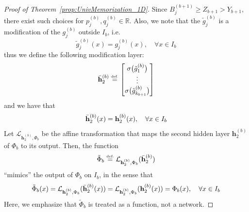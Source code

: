 \documentclass{article}
\numberwithin{equation}{section}
\theoremstyle{definition}
\newcommand{\eqdef}{\ensuremath{\stackrel{\mbox{\upshape\tiny def.}}{=}}}
\begin{document}
\begin{proof}[{Proof of Theorem~\ref{prop:UnivMemorization_1D}}]
Since $B_j^{(b+1)} \ge Z_{b+1} > Y_{b+1}$, there exist such choices for $p_j^{(b)},q_j^{(b)}\in\mathbb{R}$. Also, we note that the $\tilde{g}_j^{(b)}$ is a modification of the $g_j^{(b)}$ outside $I_b$, i.e. 
\[
    \tilde{g}_j^{(b)} (x)
    =
    g_j^{(b)} (x),
    \quad \forall x \in I_b
\]
thus we define the following modification layer: 
\begin{equation}
\label{eq:def_of_h2bar}
    \Bar{\mathbf{h}}_2^{(b)} 
    \eqdef 
    \begin{bmatrix}
        \sigma \big( \tilde{g}_1^{(b)} \big)  \\
        \vdots  \\
        \sigma \big( \tilde{g}_{k_{b+1}}^{(b)} \big)
    \end{bmatrix}
\end{equation}
and we have that 
\[
    \Bar{\mathbf{h}}_2^{(b)} (x) 
    =
    \mathbf{h}_2^{(b)} (x) ,
    \quad \forall x \in I_b
\]
Let $\mathcal{L}_{\mathbf{h}_2^{(b)},\Phi_b}$ be the affine transformation that maps the second hidden layer $\mathbf{h}_2^{(b)}$ of $\Phi_b$ to its output. Then, the function
\[
    \tilde{\Phi}_b 
    \eqdef
    \mathcal{L}_{\mathbf{h}_2^{(b)},\Phi_b} 
    (\Bar{\mathbf{h}}_2^{(b)})
\]
``mimics'' the output of $\Phi_b$ on $I_b$, in the sense that
\[
    \tilde{\Phi}_b (x)
    = 
    \mathcal{L}_{\mathbf{h}_2^{(b)},\Phi_b} 
    (\Bar{\mathbf{h}}_2^{(b)} (x))
    =
    \mathcal{L}_{\mathbf{h}_2^{(b)},\Phi_b} 
    (\mathbf{h}_2^{(b)} (x))
    =
    \Phi_b(x),
    \quad \forall x \in I_b
\]
Here, we emphasize that $\tilde{\Phi}_b$ is treated as a function, not a network. 


\end{proof}
\end{document}
